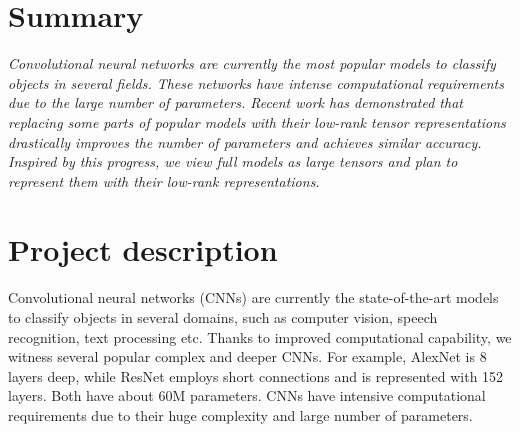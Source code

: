 \documentclass[11pt]{article}
\begin{document}
\section*{Summary}
	\emph{Convolutional neural networks are currently the most popular models to classify objects in several fields. These networks have intense computational requirements due to the large number of parameters. Recent work has demonstrated that replacing some parts of popular models with their low-rank tensor representations drastically improves the number of parameters and achieves similar accuracy. Inspired by this progress, we view full models as large tensors and plan to represent them with their low-rank representations.
	}
\section{Project description}

Convolutional neural networks  (CNNs) are currently the state-of-the-art models to classify objects in several domains, such as computer vision, speech recognition, text processing etc. Thanks to improved computational capability, we witness several popular complex and deeper CNNs. For example, AlexNet is 8 layers deep, while ResNet employs short connections and is represented with 152 layers. Both have about 60M parameters. CNNs have intensive computational requirements due to their huge complexity and large number of parameters. 
\end{document}
